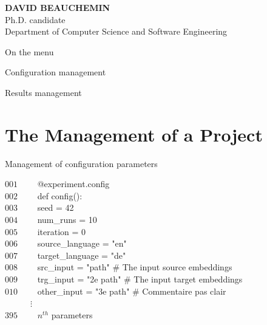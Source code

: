 \documentclass[aspectratio=169,10pt,xcolor=x11names,english,french]{beamer}
\makeatletter
\newenvironment{Scode}{%
	\def\FrameCommand##1{\hskip\@totalleftmargin
		\vrule width 3pt\colorbox{codebg}{\hspace{5pt}##1}%
		\hskip-\linewidth \hskip-\@totalleftmargin \hskip\columnwidth}%
	\MakeFramed {\advance\hsize-\width
		\@totalleftmargin\z@ \linewidth\hsize
		\advance\labelsep\fboxsep
		\@setminipage}%
}{\par\unskip\@minipagefalse\endMakeFramed}
\makeatother
\begin{document}
\begin{frame}
		\begin{minipage}{0.25\linewidth}
			\small
			\textbf{DAVID BEAUCHEMIN} \\
			Ph.D. candidate \\
			Department of Computer Science and Software Engineering
		\end{minipage}
	\end{frame}

	\begin{frame}{On the menu}
		\begin{minipage}{0.49\linewidth}
				\centering
				\fontsize{35}{35}\faCog\vfil
				\vspace{1em}
				\normalsize Configuration management
				
		\end{minipage}
		\begin{minipage}{0.49\linewidth}
				\centering
				\fontsize{35}{35}\faAreaChart\vfil
				\vspace{1em}
				\normalsize Results management
		\end{minipage}
	\end{frame}
	
	\section{The Management of a Project}
	\begin{frame}{Management of configuration parameters}
		\begin{Scode} 
			$001 \qquad$ @experiment.config \\
			$002 \qquad$ def config(): \\
			$003 \qquad$ \quad	seed = 42 \\
			$004 \qquad$ \quad	num\_runs = 10 \\
			$005 \qquad$ \quad	iteration = 0 \\
			$006 \qquad$ \quad	source\_language = "en" \\
			$007 \qquad$ \quad	target\_language = "de" \\
			$008 \qquad$ \quad 	src\_input = "path"  \# The input source embeddings \\
			$009 \qquad$ \quad 	trg\_input = "2e path" \# The input target embeddings \\
			$010 \qquad$ \quad 	other\_input = "3e path" \# Commentaire pas clair \\
			$\:\:\: \qquad$ \quad   $\vdots$ \\
			$395 \qquad$ \quad   $n^{th}$ parameters \\
		\end{Scode}
	\end{frame}
\end{document}
